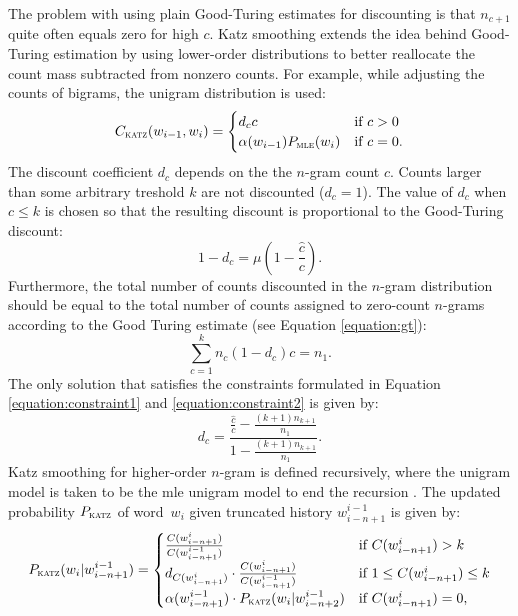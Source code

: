 	The problem with using plain Good-Turing estimates for discounting is that $n_{c+1}$ quite often equals zero for high $c$. Katz smoothing extends the idea behind Good-Turing estimation by using lower-order distributions to better reallocate the count mass subtracted from nonzero counts. For example, while adjusting the counts of bigrams, the unigram distribution is used: 
	\begin{equation}
		C_{\textsc{katz}}(w_{i-1}, w_{i})=
		\begin{cases}
			d_{c}c & \text{if } c>0 \\
			\alpha(w_{i-1})P_{\textsc{mle}}(w_{i}) & \text{if } c=0.
		\end{cases}
	\end{equation}
	The discount coefficient $d_{c}$ depends on the the \mbox{$n$-gram} count $c$. Counts larger than some arbitrary treshold $k$ are not discounted ($d_{c}=1$). The value of $d_{c}$ when $c\leq k$ is chosen so that the resulting discount is proportional to the Good-Turing discount: 
	\begin{equation}
		1-d_{c}=\mu(1-\frac{\hat{c}}{c}).
		\label{equation:constraint1}
	\end{equation}
	Furthermore, the total number of counts discounted in the \mbox{$n$-gram} distribution should be equal to the total number of counts assigned to zero-count \mbox{$n$-grams} according to the Good Turing estimate (see Equation \ref{equation:gt}):
	\begin{equation}
		\sum_{c=1}^{k}n_{c}(1-d_{c})c=n_{1}.
		\label{equation:constraint2}
	\end{equation}
	The only solution that satisfies the constraints formulated in Equation \ref{equation:constraint1} and \ref{equation:constraint2} is given by:
	\begin{equation}
		d_{c}=\frac{\frac{\hat{c}}{c}-\frac{(k+1)n_{k+1}}{n_{1}}}{1-\frac{(k+1)n_{k+1}}{n_{1}}}.
		\label{equation:dc}
	\end{equation}
	Katz smoothing for higher-order \mbox{$n$-gram} is defined recursively, where the unigram model is taken to be the \gls{mle} unigram model to end the recursion \cite{whittaker2000statistical}. The updated probability $P_{\textsc{katz}}$ of word~$w_{i}$ given truncated history $w_{i-n+1}^{i-1}$ is given by:
        \begin{equation}
         P_{\textsc{katz}}(w_{i}|w_{i-n+1}^{i-1})=
         \begin{cases}
            \frac{C(w_{i-n+1}^{i})}{C(w_{i-n+1}^{i-1})}& \text{if }C(w_{i-n+1}^{i}) > k\\
            d_{C(w_{i-n+1}^{i})}\cdot \frac{C(w_{i-n+1}^{i})}{C(w_{i-n+1}^{i-1})}& \text{if } 1\leq C(w_{i-n+1}^{i})\leq k\\
            \alpha(w_{i-n+1}^{i-1})\cdot P_{\textsc{katz}}(w_{i}|w_{i-n+2}^{i-1})& \text{if } C(w_{i-n+1}^{i})=0,
         \end{cases}
         \end{equation}

